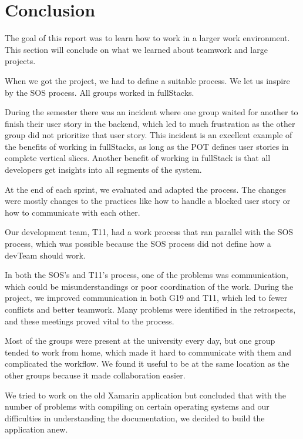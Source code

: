 \section{Conclusion}

The goal of this report was to learn how to work in a larger work environment. This section will conclude on what we learned about teamwork and large projects. 

When we got the project, we had to define a suitable process. We let us inspire by the \gls{SOS} process. All groups worked in \glspl{fullStack}. 

During the semester there was an incident where one group waited for another to finish their user story in the backend, which led to much frustration as the other group did not prioritize that user story. This incident is an excellent example of the benefits of working in \glspl{fullStack}, as long as the \gls{POT} defines user stories in complete vertical slices. Another benefit of working in \gls{fullStack} is that all developers get insights into all segments of the system.

At the end of each sprint, we evaluated and adapted the process. The changes were mostly changes to the practices like how to handle a blocked user story or how to communicate with each other.

Our development team, \gls{T11}, had a work process that ran parallel with the \gls{SOS} process, which was possible because the \gls{SOS} process did not define how a \gls{devTeam} should work.

In both the \gls{SOS}'s and \gls{T11}'s process, one of the problems was communication, which could be misunderstandings or poor coordination of the work. During the project, we improved communication in both \gls{G19} and \gls{T11}, which led to fewer conflicts and better teamwork. Many problems were identified in the retrospects, and these meetings proved vital to the process. 

Most of the groups were present at the university every day, but one group tended to work from home, which made it hard to communicate with them and complicated the workflow. We found it useful to be at the same location as the other groups because it made collaboration easier.

We tried to work on the old Xamarin application but concluded that with the number of problems with compiling on certain operating systems and our difficulties in understanding the documentation, we decided to build the application anew. 

